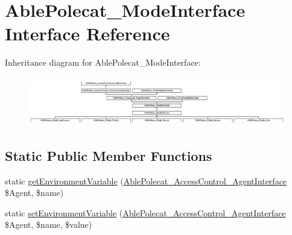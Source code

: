 \hypertarget{interface_able_polecat___mode_interface}{}\section{Able\+Polecat\+\_\+\+Mode\+Interface Interface Reference}
\label{interface_able_polecat___mode_interface}
Inheritance diagram for Able\+Polecat\+\_\+\+Mode\+Interface\+:\begin{figure}[H]
\begin{center}
\leavevmode
\includegraphics[height=2.167742cm]{interface_able_polecat___mode_interface}
\end{center}
\end{figure}
\subsection*{Static Public Member Functions}
\begin{DoxyCompactItemize}
\item 
static \hyperlink{interface_able_polecat___mode_interface_a04e7e0f41da8037ae797868b61b6df77}{get\+Environment\+Variable} (\hyperlink{interface_able_polecat___access_control___agent_interface}{Able\+Polecat\+\_\+\+Access\+Control\+\_\+\+Agent\+Interface} \$Agent, \$name)
\item 
static \hyperlink{interface_able_polecat___mode_interface_a68bdefd00518f09963ea3fa95cd2a242}{set\+Environment\+Variable} (\hyperlink{interface_able_polecat___access_control___agent_interface}{Able\+Polecat\+\_\+\+Access\+Control\+\_\+\+Agent\+Interface} \$Agent, \$name, \$value)
\end{DoxyCompactItemize}
